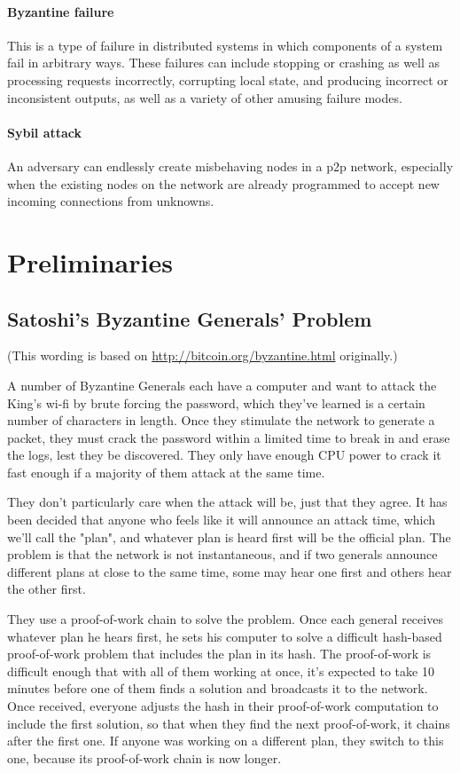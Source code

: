 \documentclass[letterpaper]{article}
\begin{document}
\paragraph{Byzantine failure} This is a type of failure in distributed systems
in which components of a system fail in arbitrary ways. These failures can
include stopping or crashing as well as processing requests incorrectly,
corrupting local state, and producing incorrect or inconsistent outputs, as
well as a variety of other amusing failure modes.

\paragraph{Sybil attack} An adversary can endlessly create misbehaving nodes in
a p2p network, especially when the existing nodes on the network are already
programmed to accept new incoming connections from unknowns.

\section{Preliminaries}

\subsection{Satoshi's Byzantine Generals' Problem}

(This wording is based on \url{http://bitcoin.org/byzantine.html} originally.)

A number of Byzantine Generals each have a computer and want to attack the
King's wi-fi by brute forcing the password, which they've learned is a certain
number of characters in length. Once they stimulate the network to generate a
packet, they must crack the password within a limited time to break in and
erase the logs, lest they be discovered. They only have enough CPU power to
crack it fast enough if a majority of them attack at the same time.

They don't particularly care when the attack will be, just that they agree. It
has been decided that anyone who feels like it will announce an attack time,
which we'll call the "plan", and whatever plan is heard first will be the
official plan. The problem is that the network is not instantaneous, and if two
generals announce different plans at close to the same time, some may hear one
first and others hear the other first.

They use a proof-of-work chain to solve the problem. Once each general receives
whatever plan he hears first, he sets his computer to solve a difficult
hash-based proof-of-work problem that includes the plan in its hash. The
proof-of-work is difficult enough that with all of them working at once, it's
expected to take 10 minutes before one of them finds a solution and broadcasts
it to the network. Once received, everyone adjusts the hash in their
proof-of-work computation to include the first solution, so that when they find
the next proof-of-work, it chains after the first one. If anyone was working on
a different plan, they switch to this one, because its proof-of-work chain is
now longer.
\end{document}
